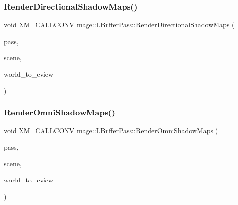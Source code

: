 \subsubsection{\texorpdfstring{Render\+Directional\+Shadow\+Maps()}{RenderDirectionalShadowMaps()}}
{\footnotesize\ttfamily void X\+M\+\_\+\+C\+A\+L\+L\+C\+O\+NV mage\+::\+L\+Buffer\+Pass\+::\+Render\+Directional\+Shadow\+Maps (\begin{DoxyParamCaption}\item[{\hyperlink{classmage_1_1_depth_pass}{Depth\+Pass} $\ast$}]{pass,  }\item[{const \hyperlink{classmage_1_1_scene}{Scene} \&}]{scene,  }\item[{F\+X\+M\+M\+A\+T\+R\+IX}]{world\+\_\+to\+\_\+cview }\end{DoxyParamCaption})\hspace{0.3cm}{\ttfamily [private]}}

\hypertarget{structmage_1_1_l_buffer_pass_ae852ab53bcf57c9469fa6cf530c3009d}{}\label{structmage_1_1_l_buffer_pass_ae852ab53bcf57c9469fa6cf530c3009d} 
\subsubsection{\texorpdfstring{Render\+Omni\+Shadow\+Maps()}{RenderOmniShadowMaps()}}
{\footnotesize\ttfamily void X\+M\+\_\+\+C\+A\+L\+L\+C\+O\+NV mage\+::\+L\+Buffer\+Pass\+::\+Render\+Omni\+Shadow\+Maps (\begin{DoxyParamCaption}\item[{\hyperlink{classmage_1_1_depth_pass}{Depth\+Pass} $\ast$}]{pass,  }\item[{const \hyperlink{classmage_1_1_scene}{Scene} \&}]{scene,  }\item[{F\+X\+M\+M\+A\+T\+R\+IX}]{world\+\_\+to\+\_\+cview }\end{DoxyParamCaption})\hspace{0.3cm}{\ttfamily [private]}}

\hypertarget{structmage_1_1_l_buffer_pass_a9db1903df31224e36ebff1271aceca41}{}\label{structmage_1_1_l_buffer_pass_a9db1903df31224e36ebff1271aceca41} 
